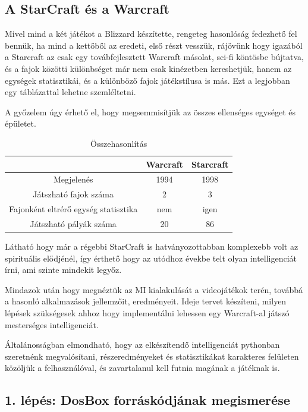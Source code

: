 \subsection{A StarCraft és a Warcraft}
Mivel mind a két játékot a Blizzard készítette, rengeteg hasonlóság fedezhető fel bennük, ha mind a kettőből az eredeti, első részt vesszük, rájövünk hogy igazából a Starcraft az csak egy továbfejlesztett Warcraft másolat, sci-fi köntösbe bújtatva, és a fajok közötti különbséget már nem csak kinézetben kereshetjük, hanem az egységek statisztikái, és a különböző fajok játékstílusa is más. Ezt a legjobban egy táblázattal lehetne szemléltetni.

A győzelem úgy érhető el, hogy megsemmisítjük az összes ellenséges egységet és épületet.
\begin{table}[h]
    \centering
    \caption{Összehasonlítás}
    \label{tab:osszehasonlitas}
    \begin{tabular}{|c|c|c|}
    \hline
    ~ & Warcraft & Starcraft \\
    \hline
    Megjelenés & 1994 & 1998 \\
    Játszható fajok száma & 2 & 3 \\
    Fajonként eltrérő egység statisztika & nem & igen \\
    Játszható pályák száma & 20 & 86 \\
    \hline
    \end{tabular}
\end{table}

Látható hogy már a régebbi StarCraft is hatványozottabban komplexebb volt az spirituális elődjénél, így érthető hogy az utódhoz évekbe telt olyan intelligenciát írni, ami szinte mindekit legyőz.



Mindazok után hogy megnéztük az MI kialakulását a videojátékok terén, továbbá a hasonló alkalmazások jellemzőit, eredményeit. Ideje tervet készíteni, milyen lépések szükségesek ahhoz hogy implementálni lehessen egy Warcraft-al játszó mesterséges intelligenciát.

Általánosságban elmondható, hogy az elkészítendő intelligenciát pythonban szeretnénk megvalósítani, részeredményeket és statisztikákat karakteres felületen közöljük a felhasználóval, és zavartalanul kell futnia magának a játéknak is.

\subsection{1. lépés: DosBox forráskódjának megismerése}

